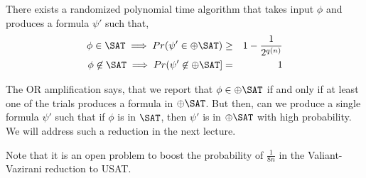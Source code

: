 \documentclass[11pt]{article}
\begin{document}
\begin{lemma}
There exists a randomized polynomial time algorithm that takes input $\phi$ and produces a formula $\psi'$ such that,
\begin{eqnarray*}
\phi \in \SAT \implies Pr(\psi' \in \oplus\SAT) & \geq & 1-\frac{1}{2^{q(n)}} \\
\phi \not\in \SAT \implies Pr (\psi' \not\in \oplus\SAT] & = & 1
\end{eqnarray*}
\end{lemma}

The OR amplification says, that we report that $\phi \in \oplus\SAT$ if and only if at least one of the trials produces a formula in $\oplus\SAT$. But then, can we produce a single formula $\psi'$ such that if $\phi$ is in $\SAT$, then $\psi'$ is in $\oplus\SAT$ with high probability. We will address such a reduction in the next lecture.


Note that it is an open problem to boost the probability of $\frac{1}{8n}$ in the Valiant-Vazirani reduction to USAT.%
\end{document}
